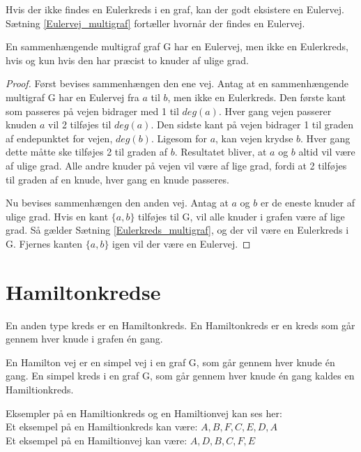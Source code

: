 \noindent Hvis der ikke findes en Eulerkreds i en graf, kan der godt eksistere en Eulervej. 
Sætning \ref{Eulervej_multigraf} fortæller hvornår der findes en Eulervej. 

\begin{thm} \label{Eulervej_multigraf}
En sammenhængende multigraf graf G har en Eulervej, men ikke en Eulerkreds, hvis og kun hvis den har præcist to knuder af ulige grad.  
\end{thm} 

\begin{proof}
Først bevises sammenhængen den ene vej. 
Antag at en sammenhængende multigraf G har en Eulervej fra $a$ til $b$, men ikke en Eulerkreds. 
Den første kant som passeres på vejen bidrager med 1 til $deg(a)$. 
Hver gang vejen passerer knuden $a$ vil 2 tilføjes til $deg(a)$. 
Den sidste kant på vejen bidrager 1 til graden af endepunktet for vejen, $deg(b)$. 
Ligesom for $a$, kan vejen krydse $b$. 
Hver gang dette måtte ske tilføjes 2 til graden af $b$. 
Resultatet bliver, at $a$ og $b$ altid vil være af ulige grad. 
Alle andre knuder på vejen vil være af lige grad, fordi at 2 tilføjes til graden af en knude, hver gang en knude passeres.  

Nu bevises sammenhængen den anden vej.
Antag at $a$ og $b$ er de eneste knuder af ulige grad. 
Hvis en kant $\lbrace a,b \rbrace$ tilføjes til G, vil alle knuder i grafen være af lige grad. 
Så gælder Sætning \ref{Eulerkreds_multigraf}, og der vil være en Eulerkreds i G. 
Fjernes kanten $\lbrace a,b \rbrace$ igen vil der være en Eulervej. 
\end{proof}

\section{Hamiltonkredse}
En anden type kreds er en Hamiltonkreds. 
En Hamiltonkreds er en kreds som går gennem hver knude i grafen én gang. 

\begin{defn} \label{hamiltion_defn}
En Hamilton vej er en simpel vej i en graf G, som går gennem hver knude én gang.
En simpel kreds i en graf G, som går gennem hver knude én gang kaldes en Hamiltionkreds.
\end{defn}

\begin{exmp}
Eksempler på en Hamiltionkreds og en Hamiltionvej kan ses her: \\



\noindent Et eksempel på en Hamiltionkreds kan være: $A,B,F,C,E,D,A$\\
Et eksempel på en Hamiltionvej kan være: $A,D,B,C,F,E$
\end{exmp}

